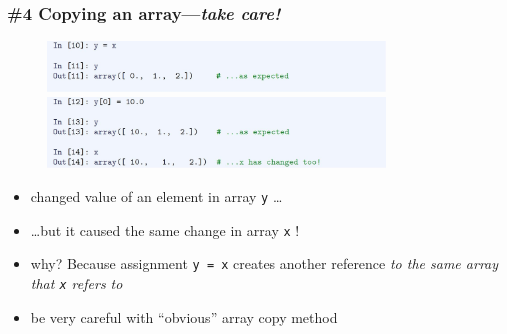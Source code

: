 \documentclass[14pt]{beamer}
\newcommand\red[1]{{\color{red} #1}}
\begin{document}

\begin{frame}[fragile]

\frametitle{\#4 Copying an array---\emph{take care!}}

\begin{figure}[ht]
	\centering
	\includegraphics[width=0.8\textwidth]{figures/LLp50a}
	\includegraphics[width=0.8\textwidth]{figures/LLp51b}
\end{figure}

\vspace*{-5mm}

\begin{itemize}
	\item changed value of an element in array \texttt{y} \ldots
	\item[] \ldots but it caused the same change in array \texttt{x} !
	
	\item why? Because assignment \texttt{y = x} creates another reference \emph{to the same array that \texttt{x} refers to}
	\item \red{be very careful} with ``obvious'' array copy method

\end{itemize}

\end{frame}

\end{document}
